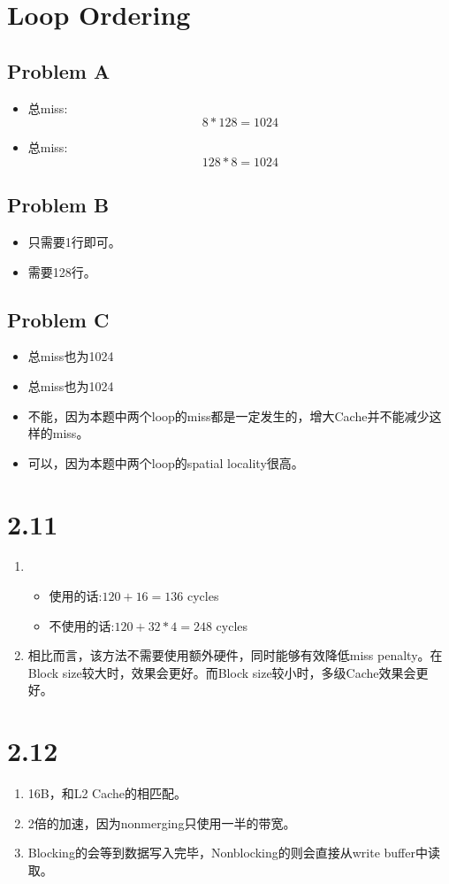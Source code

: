 \documentclass[a4paper,11pt]{article}
\begin{document}
\section{Loop Ordering}
\subsection*{Problem A}
\begin{itemize}
	\item 总miss:
	\[
		8 * 128 = 1024
	\]
	\item 总miss:
	\[
		128 * 8 = 1024
	\]
\end{itemize}
\subsection*{Problem B}
\begin{itemize}
	\item 只需要1行即可。
	\item 需要128行。
\end{itemize}
\subsection*{Problem C}
\begin{itemize}
	\item 总miss也为1024
	\item 总miss也为1024
	\item 不能，因为本题中两个loop的miss都是一定发生的，增大Cache并不能减少这样的miss。
	\item 可以，因为本题中两个loop的spatial locality很高。
\end{itemize}
\section{2.11}
\begin{enumerate}
	\item \begin{itemize}
		\item 使用的话:$120 + 16 = 136$ cycles
		\item 不使用的话:$120 + 32 * 4 = 248$ cycles
	\end{itemize}
	\item 相比而言，该方法不需要使用额外硬件，同时能够有效降低miss penalty。在Block size较大时，效果会更好。而Block size较小时，多级Cache效果会更好。
\end{enumerate}
\section{2.12}
\begin{enumerate}
	\item 16B，和L2 Cache的相匹配。
	\item 2倍的加速，因为nonmerging只使用一半的带宽。
	\item Blocking的会等到数据写入完毕，Nonblocking的则会直接从write buffer中读取。
\end{enumerate}
\end{document}

